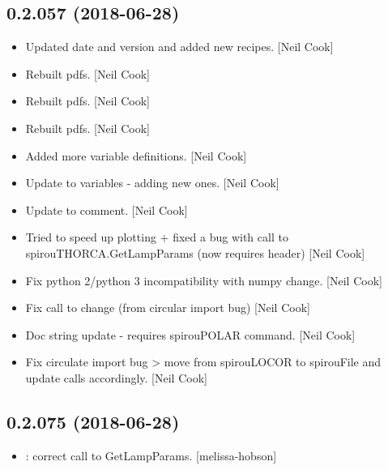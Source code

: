 \documentclass[a4paper,10pt,english]{report}
\begin{document}
\subsection{0.2.057 (2018-06-28)}
\label{\detokenize{misc/changelog:id407}}\begin{itemize}
\item {} 
Updated date and version and added new recipes. {[}Neil Cook{]}

\item {} 
Rebuilt pdfs. {[}Neil Cook{]}

\item {} 
Rebuilt pdfs. {[}Neil Cook{]}

\item {} 
Rebuilt pdfs. {[}Neil Cook{]}

\item {} 
Added more variable definitions. {[}Neil Cook{]}

\item {} 
Update to variables - adding new ones. {[}Neil Cook{]}

\item {} 
Update to comment. {[}Neil Cook{]}

\item {} 
Tried to speed up plotting + fixed a bug with call to
spirouTHORCA.GetLampParams (now requires header) {[}Neil Cook{]}

\item {} 
Fix python 2/python 3 incompatibility with numpy change. {[}Neil Cook{]}

\item {} 
Fix call to  change (from circular import bug) {[}Neil Cook{]}

\item {} 
Doc string update - requires spirouPOLAR command. {[}Neil Cook{]}

\item {} 
Fix circulate import bug \textendash{}\textgreater{} move  from spirouLOCOR to
spirouFile and update calls accordingly. {[}Neil Cook{]}

\end{itemize}


\subsection{0.2.075 (2018-06-28)}
\label{\detokenize{misc/changelog:id408}}\begin{itemize}
\item {} 
: correct call to GetLampParams. {[}melissa-hobson{]}

\end{itemize}
\end{document}

